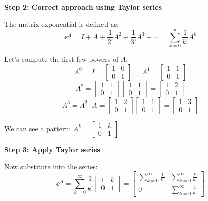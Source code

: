 \documentclass[11pt,a4paper]{article}
\begin{document}
\textbf{Step 2: Correct approach using Taylor series}

The matrix exponential is defined as:
\begin{equation}
	\ee^A = I + A + \frac{1}{2!}A^2 + \frac{1}{3!}A^3 + \cdots = \sum_{k=0}^{\infty} \frac{1}{k!}A^k
\end{equation}

Let's compute the first few powers of $A$:
\begin{equation}
	A^0 = I = \begin{bmatrix} 1 & 0 \\ 0 & 1 \end{bmatrix}, \quad
	A^1 = \begin{bmatrix} 1 & 1 \\ 0 & 1 \end{bmatrix}
\end{equation}
\begin{equation}
	A^2 = \begin{bmatrix} 1 & 1 \\ 0 & 1 \end{bmatrix}\begin{bmatrix} 1 & 1 \\ 0 & 1 \end{bmatrix} = \begin{bmatrix} 1 & 2 \\ 0 & 1 \end{bmatrix}
\end{equation}
\begin{equation}
	A^3 = A^2 \cdot A = \begin{bmatrix} 1 & 2 \\ 0 & 1 \end{bmatrix}\begin{bmatrix} 1 & 1 \\ 0 & 1 \end{bmatrix} = \begin{bmatrix} 1 & 3 \\ 0 & 1 \end{bmatrix}
\end{equation}

We can see a pattern: $A^k = \begin{bmatrix} 1 & k \\ 0 & 1 \end{bmatrix}$

\textbf{Step 3: Apply Taylor series}

Now substitute into the series:
\begin{equation}
	\ee^A = \sum_{k=0}^{\infty} \frac{1}{k!}\begin{bmatrix} 1 & k \\ 0 & 1 \end{bmatrix} = \begin{bmatrix} \sum_{k=0}^{\infty} \frac{1}{k!} & \sum_{k=0}^{\infty} \frac{k}{k!} \\ 0 & \sum_{k=0}^{\infty} \frac{1}{k!} \end{bmatrix}
\end{equation}
\end{document}
